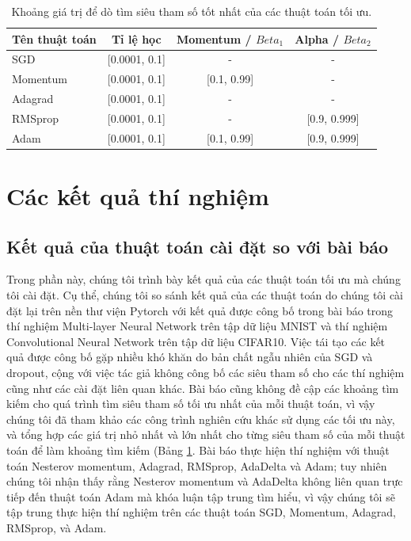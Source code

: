 \begin{center}
	\begin{table}
		\begin{tabular}{|l|c|c|c|}
			\hline
			Tên thuật toán & Tỉ lệ học & Momentum / $Beta_1$ & Alpha / $Beta_2$ \\
			\hline
			SGD & [0.0001, 0.1] & - & - \\
			\hline
			Momentum & [0.0001, 0.1] & [0.1, 0.99] & - \\
			\hline
			Adagrad & [0.0001, 0.1] & - & - \\
			\hline
			RMSprop & [0.0001, 0.1] & - & [0.9, 0.999] \\
			\hline
			Adam & [0.0001, 0.1] & [0.1, 0.99] & [0.9, 0.999] \\
			\hline
		\end{tabular}
	\caption{\label{tab:hparam-search}Khoảng giá trị để dò tìm siêu tham số tốt nhất của các thuật toán tối ưu.}
	\end{table}
\end{center}

\section{Các kết quả thí nghiệm}

\subsection{Kết quả của thuật toán cài đặt so với bài báo}

Trong phần này, chúng tôi trình bày kết quả của các thuật toán tối ưu mà chúng tôi cài đặt. Cụ thể, chúng tôi so sánh kết quả của các thuật toán do chúng tôi cài đặt lại trên nền thư viện Pytorch với kết quả được công bố trong bài báo trong thí nghiệm Multi-layer Neural Network trên tập dữ liệu MNIST và thí nghiệm Convolutional Neural Network trên tập dữ liệu CIFAR10. Việc tái tạo các kết quả được công bố gặp nhiều khó khăn do bản chất ngẫu nhiên của SGD và dropout, cộng với việc tác giả không công bố các siêu tham số cho các thí nghiệm cũng như các cài đặt liên quan khác. Bài báo cũng không đề cập các khoảng tìm kiếm cho quá trình tìm siêu tham số tối ưu nhất của mỗi thuật toán, vì vậy chúng tôi đã tham khảo các công trình nghiên cứu khác sử dụng các tối ưu này, và tổng hợp các giá trị nhỏ nhất và lớn nhất cho từng siêu tham số của mỗi thuật toán để làm khoảng tìm kiếm (Bảng \ref{tab:hparam-search}. Bài báo thực hiện thí nghiệm với thuật toán Nesterov momentum, Adagrad, RMSprop, AdaDelta và Adam; tuy nhiên chúng tôi nhận thấy rằng Nesterov momentum và AdaDelta không liên quan trực tiếp đến thuật toán Adam mà khóa luận tập trung tìm hiểu, vì vậy chúng tôi sẽ tập trung thực hiện thí nghiệm trên các thuật toán SGD, Momentum, Adagrad, RMSprop, và Adam.

